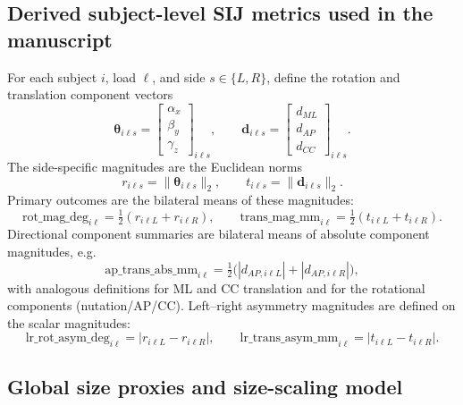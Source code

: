 \subsection{Derived subject-level SIJ metrics used in the manuscript}
For each subject $i$, load $\ell$, and side $s\in\{L,R\}$, define the rotation and translation component vectors
\begin{equation}
\boldsymbol{\theta}_{i\ell s}=
\begin{bmatrix}\alpha_x\\ \beta_y\\ \gamma_z\end{bmatrix}_{i\ell s},
\qquad
\mathbf{d}_{i\ell s}=
\begin{bmatrix}d_{ML}\\ d_{AP}\\ d_{CC}\end{bmatrix}_{i\ell s}.
\end{equation}
The side-specific magnitudes are the Euclidean norms
\begin{equation}
r_{i\ell s}=\|\boldsymbol{\theta}_{i\ell s}\|_2,
\qquad
t_{i\ell s}=\|\mathbf{d}_{i\ell s}\|_2.
\end{equation}
Primary outcomes are the bilateral means of these magnitudes:
\begin{equation}
\mathrm{rot\_mag\_deg}_{i\ell}=\tfrac{1}{2}(r_{i\ell L}+r_{i\ell R}),
\qquad
\mathrm{trans\_mag\_mm}_{i\ell}=\tfrac{1}{2}(t_{i\ell L}+t_{i\ell R}).
\end{equation}
Directional component summaries are bilateral means of absolute component magnitudes, e.g.
\begin{equation}
\mathrm{ap\_trans\_abs\_mm}_{i\ell}=\tfrac{1}{2}\big(|d_{AP,i\ell L}|+|d_{AP,i\ell R}|\big),
\end{equation}
with analogous definitions for ML and CC translation and for the rotational components (nutation/AP/CC).
Left--right asymmetry magnitudes are defined on the scalar magnitudes:
\begin{equation}
\mathrm{lr\_rot\_asym\_deg}_{i\ell}=|r_{i\ell L}-r_{i\ell R}|,
\qquad
\mathrm{lr\_trans\_asym\_mm}_{i\ell}=|t_{i\ell L}-t_{i\ell R}|.
\end{equation}

\subsection{Global size proxies and size-scaling model}
